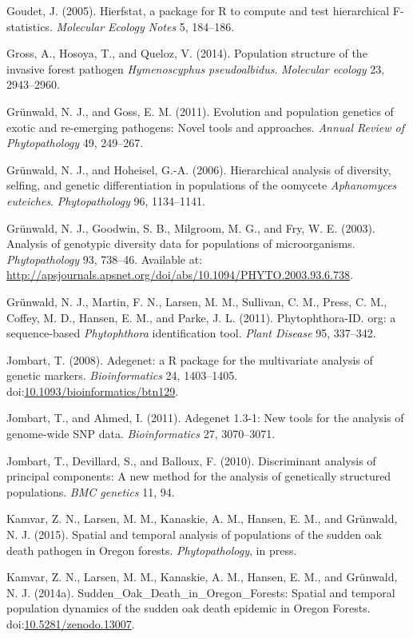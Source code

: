\documentclass{frontiersSCNS} %
\begin{document}
Goudet, J. (2005). Hierfstat, a package for R to compute and test
hierarchical F-statistics. \emph{Molecular Ecology Notes} 5, 184--186.

Gross, A., Hosoya, T., and Queloz, V. (2014). Population structure of
the invasive forest pathogen \emph{Hymenoscyphus pseudoalbidus}.
\emph{Molecular ecology} 23, 2943--2960.

Gr\"{u}nwald, N. J., and Goss, E. M. (2011). Evolution and population
genetics of exotic and re-emerging pathogens: Novel tools and
approaches. \emph{Annual Review of Phytopathology} 49, 249--267.

Gr{\"{u}}nwald, N. J., and Hoheisel, G.-A. (2006). Hierarchical analysis of
diversity, selfing, and genetic differentiation in populations of the
oomycete \emph{Aphanomyces euteiches}. \emph{Phytopathology} 96,
1134--1141.

Gr\"{u}nwald, N. J., Goodwin, S. B., Milgroom, M. G., and Fry, W. E. (2003).
Analysis of genotypic diversity data for populations of microorganisms.
\emph{Phytopathology} 93, 738--46. Available at:
\url{http://apsjournals.apsnet.org/doi/abs/10.1094/PHYTO.2003.93.6.738}.

Gr{\"{u}}nwald, N. J., Martin, F. N., Larsen, M. M., Sullivan, C. M., Press,
C. M., Coffey, M. D., Hansen, E. M., and Parke, J. L. (2011).
Phytophthora-ID. org: a sequence-based \emph{Phytophthora}
identification tool. \emph{Plant Disease} 95, 337--342.

Jombart, T. (2008). Adegenet: a R package for the multivariate analysis
of genetic markers. \emph{Bioinformatics} 24, 1403--1405.
doi:\href{http://dx.doi.org/10.1093/bioinformatics/btn129}{10.1093/bioinformatics/btn129}.

Jombart, T., and Ahmed, I. (2011). Adegenet 1.3-1: New tools for the
analysis of genome-wide SNP data. \emph{Bioinformatics} 27, 3070--3071.

Jombart, T., Devillard, S., and Balloux, F. (2010). Discriminant
analysis of principal components: A new method for the analysis of
genetically structured populations. \emph{BMC genetics} 11, 94.

Kamvar, Z. N., Larsen, M. M., Kanaskie, A. M., Hansen, E. M., and
Gr\"{u}nwald, N. J. (2015). Spatial and temporal analysis of populations of
the sudden oak death pathogen in Oregon forests. \emph{Phytopathology},
in press.

Kamvar, Z. N., Larsen, M. M., Kanaskie, A. M., Hansen, E. M., and
Gr\"{u}nwald, N. J. (2014a). Sudden\_Oak\_Death\_in\_Oregon\_Forests:
Spatial and temporal population dynamics of the sudden oak death
epidemic in Oregon Forests.
doi:\href{http://dx.doi.org/10.5281/zenodo.13007}{10.5281/zenodo.13007}.
\end{document}
